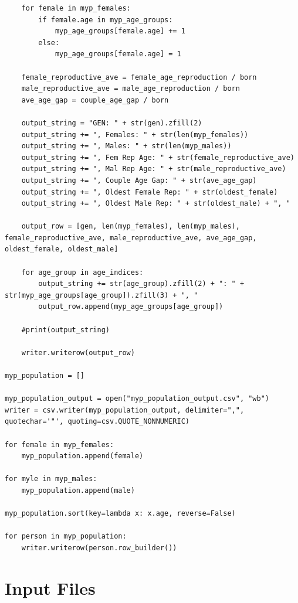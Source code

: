 \documentclass[authoryearcitations]{UoYCSproject}
\begin{document}
\begin{landscape}
\begin{verbatim}
    for female in myp_females:
        if female.age in myp_age_groups:
            myp_age_groups[female.age] += 1
        else:
            myp_age_groups[female.age] = 1

    female_reproductive_ave = female_age_reproduction / born
    male_reproductive_ave = male_age_reproduction / born
    ave_age_gap = couple_age_gap / born

    output_string = "GEN: " + str(gen).zfill(2)
    output_string += ", Females: " + str(len(myp_females))
    output_string += ", Males: " + str(len(myp_males))
    output_string += ", Fem Rep Age: " + str(female_reproductive_ave)
    output_string += ", Mal Rep Age: " + str(male_reproductive_ave)
    output_string += ", Couple Age Gap: " + str(ave_age_gap)
    output_string += ", Oldest Female Rep: " + str(oldest_female)
    output_string += ", Oldest Male Rep: " + str(oldest_male) + ", "

    output_row = [gen, len(myp_females), len(myp_males), female_reproductive_ave, male_reproductive_ave, ave_age_gap, oldest_female, oldest_male]

    for age_group in age_indices:
        output_string += str(age_group).zfill(2) + ": " +  str(myp_age_groups[age_group]).zfill(3) + ", "
        output_row.append(myp_age_groups[age_group])

    #print(output_string)

    writer.writerow(output_row)

myp_population = []

myp_population_output = open("myp_population_output.csv", "wb")
writer = csv.writer(myp_population_output, delimiter=",", quotechar='"', quoting=csv.QUOTE_NONNUMERIC)

for female in myp_females:
    myp_population.append(female)

for myle in myp_males:
    myp_population.append(male)

myp_population.sort(key=lambda x: x.age, reverse=False)

for person in myp_population:
    writer.writerow(person.row_builder())
\end{verbatim}
\end{landscape}

\chapter{Input Files}
\label{adx:inputFiles}
\end{document}
